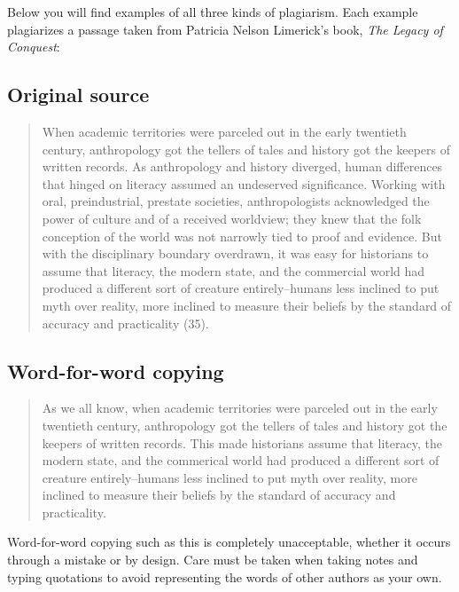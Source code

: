 Below you will find examples of all three kinds of plagiarism. Each example plagiarizes a passage
taken from Patricia Nelson Limerick's book, \emph{The Legacy of Conquest}:

\subsection{Original source}

\begin{quote}
When academic territories were parceled out in the early twentieth century, anthropology got the tellers of tales and history got the keepers of written records.  As anthropology and history diverged, human differences that hinged on literacy assumed an undeserved significance.  Working with oral, preindustrial, prestate societies, anthropologists acknowledged the power of culture and of a received worldview; they knew that the folk conception of the world was not narrowly tied to proof and evidence.  But with the disciplinary boundary overdrawn, it was easy for historians to assume that literacy, the modern state, and the commercial world had produced a different sort of creature entirely--humans less inclined to put myth over reality, more inclined to measure their beliefs by the standard of accuracy and practicality (35).
\end{quote}

\subsection{Word-for-word copying}

\begin{Spacing}{1.5}
\begin{quote}
As we all know, when academic territories were parceled out in the early twentieth century, anthropology got the tellers of tales and history got the keepers of written records. This made historians assume that literacy, the modern state, and the commerical world had produced a different sort of creature entirely--humans less inclined to put myth over reality, more inclined to measure their beliefs by the standard of accuracy and practicality. 
\end{quote} 

\end{Spacing}

 Word-for-word copying such as this is completely unacceptable, whether it occurs through a mistake or by design. Care must be taken when taking notes and typing quotations to avoid representing the words of other authors as your own. 


